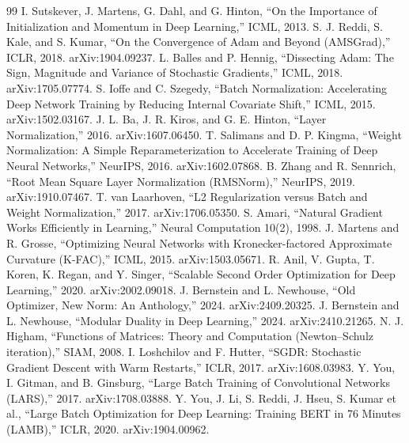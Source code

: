 \documentclass[10pt,conference]{IEEEtran}
\begin{document}
\begin{thebibliography}{99}
 I. Sutskever, J. Martens, G. Dahl, and G. Hinton, ``On the Importance of Initialization and Momentum in Deep Learning,'' ICML, 2013.
 S. J. Reddi, S. Kale, and S. Kumar, ``On the Convergence of Adam and Beyond (AMSGrad),'' ICLR, 2018. arXiv:1904.09237.
 L. Balles and P. Hennig, ``Dissecting Adam: The Sign, Magnitude and Variance of Stochastic Gradients,'' ICML, 2018. arXiv:1705.07774.
 S. Ioffe and C. Szegedy, ``Batch Normalization: Accelerating Deep Network Training by Reducing Internal Covariate Shift,'' ICML, 2015. arXiv:1502.03167.
 J. L. Ba, J. R. Kiros, and G. E. Hinton, ``Layer Normalization,'' 2016. arXiv:1607.06450.
 T. Salimans and D. P. Kingma, ``Weight Normalization: A Simple Reparameterization to Accelerate Training of Deep Neural Networks,'' NeurIPS, 2016. arXiv:1602.07868.
 B. Zhang and R. Sennrich, ``Root Mean Square Layer Normalization (RMSNorm),'' NeurIPS, 2019. arXiv:1910.07467.
 T. van Laarhoven, ``L2 Regularization versus Batch and Weight Normalization,'' 2017. arXiv:1706.05350.
 S. Amari, ``Natural Gradient Works Efficiently in Learning,'' Neural Computation 10(2), 1998.
 J. Martens and R. Grosse, ``Optimizing Neural Networks with Kronecker-factored Approximate Curvature (K-FAC),'' ICML, 2015. arXiv:1503.05671.
 R. Anil, V. Gupta, T. Koren, K. Regan, and Y. Singer, ``Scalable Second Order Optimization for Deep Learning,'' 2020. arXiv:2002.09018.
 J. Bernstein and L. Newhouse, ``Old Optimizer, New Norm: An Anthology,'' 2024. arXiv:2409.20325.
 J. Bernstein and L. Newhouse, ``Modular Duality in Deep Learning,'' 2024. arXiv:2410.21265.
 N. J. Higham, ``Functions of Matrices: Theory and Computation (Newton--Schulz iteration),'' SIAM, 2008.
 I. Loshchilov and F. Hutter, ``SGDR: Stochastic Gradient Descent with Warm Restarts,'' ICLR, 2017. arXiv:1608.03983.
 Y. You, I. Gitman, and B. Ginsburg, ``Large Batch Training of Convolutional Networks (LARS),'' 2017. arXiv:1708.03888.
 Y. You, J. Li, S. Reddi, J. Hseu, S. Kumar et al., ``Large Batch Optimization for Deep Learning: Training BERT in 76 Minutes (LAMB),'' ICLR, 2020. arXiv:1904.00962.
\end{thebibliography}
\end{document}
